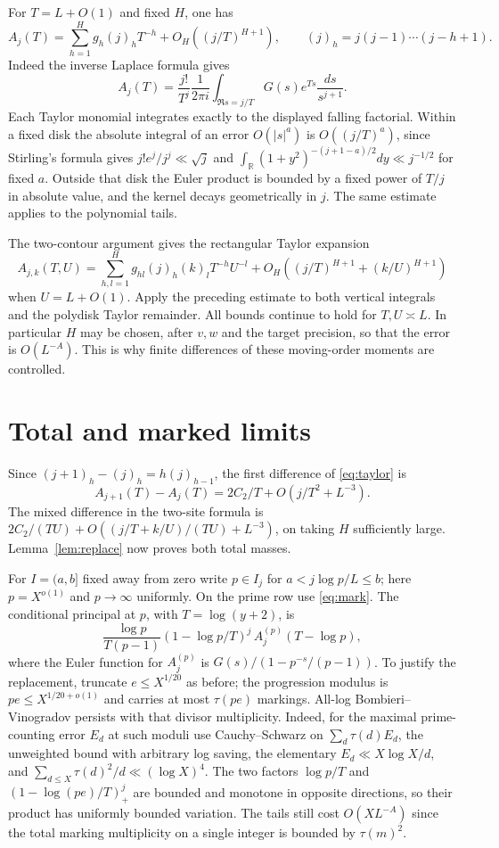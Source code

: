 \documentclass[11pt]{article}
\begin{document}
For \(T=L+O(1)\) and fixed \(H\), one has
\begin{equation}\label{eq:taylor}
 A_j(T)=\sum_{h=1}^H g_h (j)_h T^{-h}
       +O_H((j/T)^{H+1}),
 \qquad (j)_h=j(j-1)\cdots(j-h+1).
\end{equation}
Indeed the inverse Laplace formula gives
\[
 A_j(T)=\frac{j!}{T^j}\frac1{2\pi i}
       \int_{\Re s=j/T}G(s)e^{Ts}\frac{ds}{s^{j+1}}.
\]
Each Taylor monomial integrates exactly to the displayed falling factorial. Within a fixed disk the absolute integral of an error \(O(|s|^a)\) is \(O((j/T)^a)\), since Stirling's formula gives \(j!e^j/j^j\ll\sqrt j\) and \(\int_{\mathbb R}(1+y^2)^{-(j+1-a)/2}dy\ll j^{-1/2}\) for fixed \(a\). Outside that disk the Euler product is bounded by a fixed power of \(T/j\) in absolute value, and the kernel decays geometrically in \(j\). The same estimate applies to the polynomial tails.

The two-contour argument gives the rectangular Taylor expansion
\[
 A_{j,k}(T,U)=\sum_{h,l=1}^H g_{hl}(j)_h(k)_l T^{-h}U^{-l}
       +O_H((j/T)^{H+1}+(k/U)^{H+1})
\]
when \(U=L+O(1)\). Apply the preceding estimate to both vertical integrals and the polydisk Taylor remainder. All bounds continue to hold for \(T,U\asymp L\). In particular \(H\) may be chosen, after \(v,w\) and the target precision, so that the error is \(O(L^{-A})\). This is why finite differences of these moving-order moments are controlled.
\section{Total and marked limits}
Since \((j+1)_h-(j)_h=h(j)_{h-1}\), the first difference of \eqref{eq:taylor} is
\[
 A_{j+1}(T)-A_j(T)=2C_2/T+O(j/T^2+L^{-3}).
\]
The mixed difference in the two-site formula is
\(2C_2/(TU)+O((j/T+k/U)/(TU)+L^{-3})\), on taking \(H\) sufficiently large. Lemma~\ref{lem:replace} now proves both total masses.

For \(I=(a,b]\) fixed away from zero write \(p\in I_j\) for \(a<j\log p/L\le b\); here \(p=X^{o(1)}\) and \(p\to\infty\) uniformly. On the prime row use \eqref{eq:mark}. The conditional principal at \(p\), with \(T=\log(y+2)\), is
\[
 \frac{\log p}{T(p-1)}
       (1-\log p/T)^j\, A^{(p)}_j(T-\log p),
\]
where the Euler function for \(A^{(p)}_j\) is
\(G(s)/(1-p^{-s}/(p-1))\). To justify the replacement, truncate \(e\le X^{1/20}\) as before; the progression modulus is \(pe\le X^{1/20+o(1)}\) and carries at most \(\tau(pe)\) markings. All-log Bombieri--Vinogradov persists with that divisor multiplicity. Indeed, for the maximal prime-counting error \(E_d\) at such moduli use Cauchy--Schwarz on \(\sum_d \tau(d) E_d\), the unweighted bound with arbitrary log saving, the elementary \(E_d\ll X\log X/d\), and \(\sum_{d\le X}\tau(d)^2/d\ll(\log X)^4\). The two factors \(\log p/T\) and \((1-\log(pe)/T)_+^j\) are bounded and monotone in opposite directions, so their product has uniformly bounded variation. The tails still cost \(O(X L^{-A})\) since the total marking multiplicity on a single integer is bounded by \(\tau(m)^2\).
 
\end{document}
